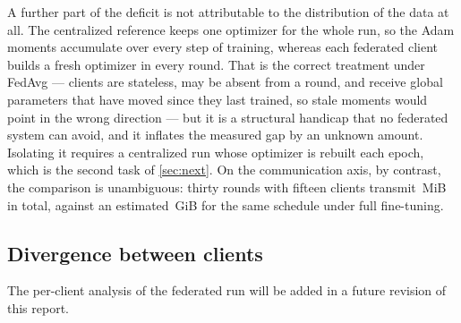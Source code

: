A further part of the deficit is not attributable to the distribution of the data at all. The centralized reference keeps one optimizer for the whole run, so the Adam moments accumulate over every step of training, whereas each federated client builds a fresh optimizer in every round. That is the correct treatment under FedAvg --- clients are stateless, may be absent from a round, and receive global parameters that have moved since they last trained, so stale moments would point in the wrong direction --- but it is a structural handicap that no federated system can avoid, and it inflates the measured gap by an unknown amount. Isolating it requires a centralized run whose optimizer is rebuilt each epoch, which is the second task of \cref{sec:next}. On the communication axis, by contrast, the comparison is unambiguous: thirty rounds with fifteen clients transmit \numUplinkRthirty\,MiB in total, against an estimated \numUplinkFullThirty\,GiB for the same schedule under full fine-tuning.

\subsection{Divergence between clients}\label{sec:hetero}

The per-client analysis of the federated run will be added in a future revision of this report.
